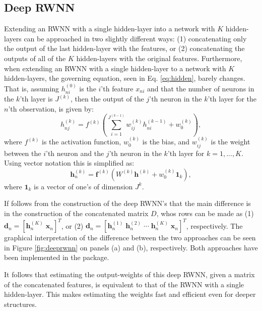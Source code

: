 \documentclass[
]{jss}
\begin{document}
\hypertarget{deepRWNN}{%
\subsection{Deep RWNN}\label{deepRWNN}}

Extending an RWNN with a single hidden-layer into a network with \(K\)
hidden-layers can be approached in two slightly different ways: (1)
concatenating only the output of the last hidden-layer with the
features, or (2) concatenating the outputs of all of the \(K\)
hidden-layers with the original features. Furthermore, when extending an
RWNN with a single hidden-layer to a network with \(K\) hidden-layers,
the governing equation, seen in Eq. \eqref{eq:hidden}, barely changes.
That is, assuming \(h_{ni}^{(0)}\) is the \(i\)'th feature \(x_{ni}\)
and that the number of neurons in the \(k\)'th layer is \(J^{(k)}\),
then the output of the \(j\)'th neuron in the \(k\)'th layer for the
\(n\)'th observation, is given by: \begin{equation}
    h_{nj}^{(k)} = f^{(k)}\left(\sum_{i = 1}^{J^{(k - 1)}} w^{(k)}_{ij} h_{ni}^{(k - 1)} + w^{(k)}_{0}\right), \label{eq:hidden2} 
\end{equation} where \(f^{(k)}\) is the activation function,
\(w^{(k)}_0\) is the bias, and \(w^{(k)}_{ij}\) is the weight between
the \(i\)'th neuron and the \(j\)'th neuron in the \(k\)'th layer for
\(k = 1, ..., K\). Using vector notation this is simplified as:
\begin{equation}
    \boldsymbol h_n^{(k)} = \boldsymbol f^{(k)}\left(W^{(k)} \boldsymbol{h}^{(k)} + w^{(k)}_0 \boldsymbol{1}_{k}\right),
\end{equation} where \(\boldsymbol{1}_k\) is a vector of one's of
dimension \(J^{k}\).

If follows from the construction of the deep RWNN's that the main
difference is in the construction of the concatenated matrix \(D\), whos
rows can be made as (1)
\(\boldsymbol{d}_n = [\boldsymbol h_n^{(K)} \; \boldsymbol x_n]^T\), or
(2)
\(\boldsymbol{d}_n = [\boldsymbol h_n^{(1)} \; \boldsymbol h_n^{(2)} \; \cdots \; \boldsymbol h_n^{(K)} \; \boldsymbol x_n]^T\),
respectively. The graphical interpretation of the difference between the
two approaches can be seen in Figure \ref{fig:deeprwnn} on panels (a)
and (b), respectively. Both approaches have been implemented in the
 package.

It follows that estimating the output-weights of this deep RWNN, given a
matrix of the concatenated features, is equivalent to that of the RWNN
with a single hidden-layer. This makes estimating the weights fast and
efficient even for deeper structures.
\end{document}
